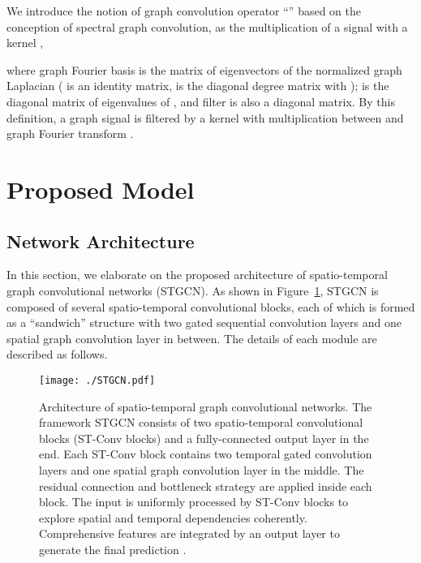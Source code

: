 \documentclass{article}
\begin{document}
We introduce the notion of graph convolution operator ``'' based on the conception of spectral graph convolution, as the multiplication of a signal  with a kernel ,

where graph Fourier basis  is the matrix of eigenvectors of the normalized graph Laplacian  ( is an identity matrix,  is the diagonal degree matrix with );  is the diagonal matrix of eigenvalues of , and filter  is also a diagonal matrix. By this definition, a graph signal  is filtered by a kernel  with multiplication between  and graph Fourier transform  \cite{shuman2013emerging}.

\section{Proposed Model}
\subsection{Network Architecture}
In this section, we elaborate on the proposed architecture of spatio-temporal graph convolutional networks (STGCN). As shown in Figure~\ref{fig:stgcn}, STGCN is composed of several spatio-temporal convolutional blocks, each of which is formed as a ``sandwich'' structure with two gated sequential convolution layers and one spatial graph convolution layer in between. The details of each module are described as follows.

\begin{figure}
	\centering
	\texttt{[image: ./STGCN.pdf]}
	\caption{\label{fig:stgcn}Architecture of spatio-temporal graph convolutional networks. The framework STGCN consists of two spatio-temporal convolutional blocks (ST-Conv blocks) and a fully-connected output layer in the end. Each ST-Conv block contains two temporal gated convolution layers and one spatial graph convolution layer in the middle. The residual connection and bottleneck strategy are applied inside each block. The input  is uniformly processed by ST-Conv blocks to explore spatial and temporal dependencies coherently. Comprehensive features are integrated by an output layer to generate the final prediction .}
\end{figure}
\end{document}
